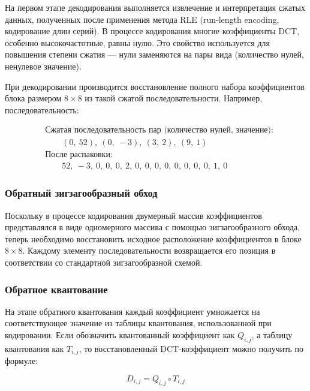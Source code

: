 На первом этапе декодирования выполняется извлечение и интерпретация сжатых данных, 
полученных после применения метода RLE (run-length encoding, кодирование длин серий). 
В процессе кодирования многие коэффициенты DCT, особенно высокочастотные, равны нулю. 
Это свойство используется для повышения степени сжатия — нули заменяются на пары вида (количество нулей, ненулевое значение).

При декодировании производится восстановление полного набора коэффициентов блока размером $8 \times 8$
из такой сжатой последовательности. Например, последовательность:

\begin{equation}
    \label{eq:rle_example}
    \begin{aligned}
        &\text{Сжатая последовательность пар (количество нулей, значение):} \\
        &\qquad (0,\ 52),\ (0,\ -3),\ (3,\ 2),\ (9,\ 1) \\
        &\text{После распаковки:} \\
        &\qquad 52,\ -3,\ 0,\ 0,\ 0,\ 2,\ 0,\ 0,\ 0,\ 0,\ 0,\ 0,\ 0,\ 0,\ 1,\ 0
    \end{aligned}
\end{equation}



\subsubsection{Обратный зигзагообразный обход}
Поскольку в процессе кодирования двумерный массив коэффициентов представлялся в виде одномерного массива 
с помощью зигзагообразного обхода, теперь необходимо восстановить исходное расположение коэффициентов в блоке $8 \times 8$. 
Каждому элементу последовательности возвращается его позиция в соответствии со стандартной зигзагообразной схемой.




\subsubsection{Обратное квантование}
На этапе обратного квантования каждый коэффициент умножается на соответствующее значение из таблицы квантования, 
использованной при кодировании. Если обозначить квантованный коэффициент как $Q_{i,j}$, а таблицу квантования как $T_{i,j}$,
то восстановленный DCT-коэффициент можно получить по формуле:

\begin{equation}
    D_{i,j} = Q_{i,j} \circ T_{i,j}
\end{equation}

